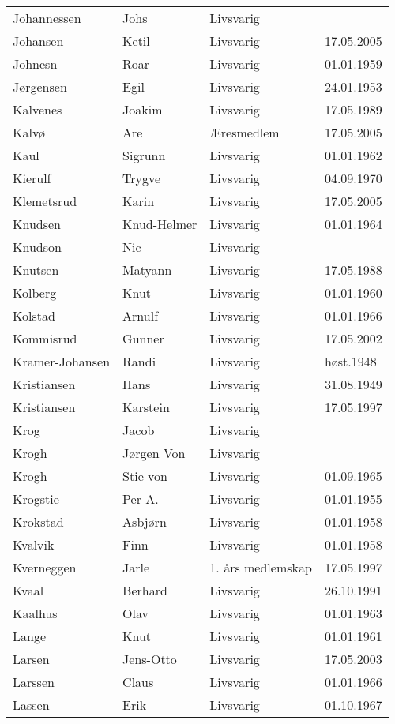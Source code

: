 \begin{longtable}{llll}
Johannessen	&	Johs	&	Livsvarig 	&		\\
Johansen 	&	Ketil	&	Livsvarig	&	17.05.2005	\\
Johnesn	&	Roar	&	Livsvarig 	&	01.01.1959	\\
Jørgensen	&	Egil	&	Livsvarig 	&	24.01.1953	\\
Kalvenes	&	Joakim	&	Livsvarig 	&	17.05.1989	\\
Kalvø 	&	Are 	&	Æresmedlem	&	17.05.2005	\\
Kaul	&	Sigrunn	&	Livsvarig 	&	01.01.1962	\\
Kierulf	&	Trygve	&	Livsvarig 	&	04.09.1970	\\
Klemetsrud 	&	Karin	&	Livsvarig	&	17.05.2005	\\
Knudsen	&	Knud-Helmer	&	Livsvarig 	&	01.01.1964	\\
Knudson	&	Nic	&	Livsvarig 	&		\\
Knutsen	&	Matyann	&	Livsvarig 	&	17.05.1988	\\
Kolberg	&	Knut	&	Livsvarig 	&	01.01.1960	\\
Kolstad	&	Arnulf	&	Livsvarig 	&	01.01.1966	\\
Kommisrud 	&	Gunner	&	Livsvarig	&	17.05.2002	\\
Kramer-Johansen	&	Randi	&	Livsvarig 	&	høst.1948	\\
Kristiansen	&	Hans	&	Livsvarig 	&	31.08.1949	\\
Kristiansen 	&	Karstein	&	Livsvarig	&	17.05.1997	\\
Krog	&	Jacob	&	Livsvarig 	&		\\
Krogh	&	Jørgen Von	&	Livsvarig 	&		\\
Krogh	&	Stie von	&	Livsvarig 	&	01.09.1965	\\
Krogstie	&	Per A.	&	Livsvarig 	&	01.01.1955	\\
Krokstad	&	Asbjørn	&	Livsvarig 	&	01.01.1958	\\
Kvalvik	&	Finn	&	Livsvarig 	&	01.01.1958	\\
Kverneggen 	&	Jarle 	&	1. års medlemskap	&	17.05.1997	\\
Kvaal	&	Berhard	&	Livsvarig 	&	26.10.1991	\\
Kaalhus	&	Olav	&	Livsvarig 	&	01.01.1963	\\
Lange	&	Knut	&	Livsvarig 	&	01.01.1961	\\
Larsen 	&	Jens-Otto	&	Livsvarig	&	17.05.2003	\\
Larssen	&	Claus	&	Livsvarig 	&	01.01.1966	\\
Lassen	&	Erik	&	Livsvarig 	&	01.10.1967	\\

\end{longtable}
